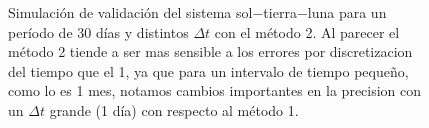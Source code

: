 \begin{figure}
{	\label{fig:ej1_m2_30_12}
	}
	\caption{
		Simulación de validación del sistema sol$-$tierra$-$luna para un período de 30 días y distintos $\Delta t$
		con el método 2.
		Al parecer el método 2 tiende a ser mas sensible a los errores por discretizacion del tiempo que el 1,
		ya que para un intervalo de tiempo pequeño, como lo es 1 mes,
		notamos cambios importantes en la precision con un $\Delta t$ grande (1 día) con respecto al método 1.
	}
	\label{ fig:res_ej1_m2_30 }
\end{figure}
